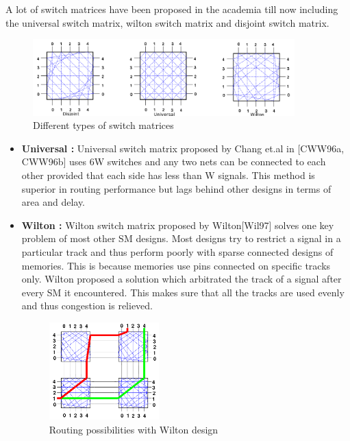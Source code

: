 A lot of switch matrices have been proposed in the academia till now including the universal switch matrix, wilton switch matrix and disjoint switch matrix.
\begin{figure}[H]
\centering
\includegraphics[width=0.9\textwidth]{switchmatrix_types.png}
\caption{Different types of switch matrices}
\label{fig:Figure}
\end{figure}
\begin{itemize}
  \item \textbf{Universal : } Universal switch matrix proposed by Chang et.al in [CWW96a, CWW96b] uses 6W switches and any two nets can be connected to each other provided that each side has less than W signals. This method is superior in routing performance but lags behind other designs in terms of area and delay.

  \item \textbf{Wilton : } Wilton switch matrix proposed by Wilton[Wil97] solves one key problem of most other SM designs. Most designs try to restrict a signal in a particular track and thus perform poorly with sparse connected designs of memories. This is because memories use pins connected on specific tracks only. Wilton proposed a solution which arbitrated the track of a signal after every SM it encountered. This makes sure that all the tracks are used evenly and thus congestion is relieved.
\begin{figure}[H]
\centering
\includegraphics[width=0.4\textwidth]{wilton_possibility.png}
\caption{Routing possibilities with Wilton design}
\label{fig:Figure}
\end{figure}


\end{itemize}
